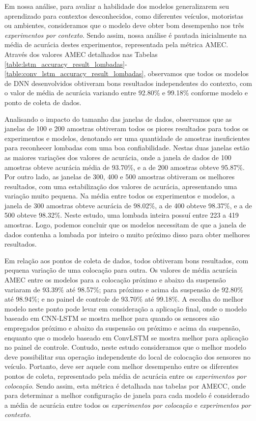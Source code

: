 Em nossa análise, para avaliar a habilidade dos modelos generalizarem seu aprendizado para contextos desconhecidos, como diferentes veículos, motoristas ou ambientes, consideramos que o modelo deve obter bom desempenho nos três \emph{experimentos por contexto}. Sendo assim, nossa análise é pautada inicialmente na média de acurácia destes experimentos, representada pela métrica AMEC. Através dos valores AMEC detalhados nas Tabelas \ref{table:lstm_accuracy_result_lombadas}-\ref{table:conv_lstm_accuracy_result_lombadas}, observamos que todos os modelos de DNN desenvolvidos obtiveram bons resultados independentes do contexto, com o valor de média de acurácia variando entre 92.80\% e 99.18\% conforme modelo e ponto de coleta de dados.

Analisando o impacto do tamanho das janelas de dados, observamos que as janelas de 100 e 200 amostras obtiveram todos os piores resultados para todos os experimentos e modelos, denotando ser uma quantidade de amostras insuficientes para reconhecer lombadas com uma boa confiabilidade. Nestas duas janelas estão as maiores variações dos valores de acurácia, onde a janela de dados de 100 amostras obteve acurácia média de 93.70\%, e a de 200 amostras obteve 95.87\%. Por outro lado, as janelas de 300, 400 e 500 amostras obtiveram os melhores resultados, com uma estabilização dos valores de acurácia, apresentando uma variação muito pequena. Na média entre todos os experimentos e modelos, a janela de 300 amostras obteve acurácia de 98.02\%, a de 400 obteve 98.37\%, e a de 500 obteve 98.32\%. Neste estudo, uma lombada inteira possuí entre 223 a 419 amostras. Logo, podemos concluir que os modelos necessitam de que a janela de dados contenha a lombada por inteiro o muito próximo disso para obter melhores resultados.

Em relação aos pontos de coleta de dados, todos obtiveram bons resultados, com pequena variação de uma colocação para outra. Os valores de média acurácia AMEC entre os modelos para a colocação próximo e abaixo da suspensão variaram de 93.39\% até 98.57\%; para próximo e acima da suspensão de 92.80\% até 98.94\%; e no painel de controle de 93.70\% até 99.18\%. A escolha do melhor modelo neste ponto pode levar em consideração a aplicação final, onde o modelo baseado em CNN-LSTM se mostra melhor para quando os sensores são empregados próximo e abaixo da suspensão ou próximo e acima da suspensão, enquanto que o modelo baseado em ConvLSTM se mostra melhor para aplicação no painel de controle. Contudo, neste estudo consideramos que o melhor modelo deve possibilitar sua operação independente do local de colocação dos sensores no veículo. Portanto, deve ser aquele com melhor desempenho entre os diferentes pontos de coleta, representado pela média de acurácia entre os \emph{experimentos por colocação}. Sendo assim, esta métrica é detalhada nas tabelas por AMECC, onde para determinar a melhor configuração de janela para cada modelo é considerado a média de acurácia entre todos os \emph{experimentos por colocação} e \emph{experimentos por contexto}.

